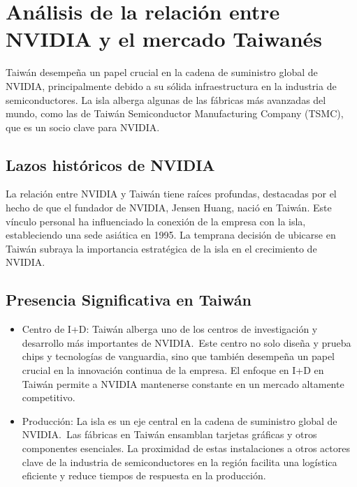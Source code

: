 \documentclass[conference]{IEEEtran}
\begin{document}
\section{Análisis de la relación entre NVIDIA y el mercado Taiwanés}

Taiwán desempeña un papel crucial en la cadena de suministro
global de NVIDIA, principalmente debido a su sólida
infraestructura en la industria de semiconductores. La isla
alberga algunas de las fábricas más avanzadas del mundo, como
las de Taiwán Semiconductor Manufacturing Company (TSMC), que
es un socio clave para NVIDIA.\@{}

\subsection*{Lazos históricos de NVIDIA}

La relación entre NVIDIA y Taiwán tiene raíces profundas, destacadas
por el hecho de que el fundador de NVIDIA, Jensen Huang, nació en
Taiwán. Este vínculo personal ha influenciado la conexión de la
empresa con la isla, estableciendo una sede asiática en 1995. La
temprana decisión de ubicarse en Taiwán subraya la importancia
estratégica de la isla en el crecimiento de NVIDIA.\@{}

\subsection*{Presencia Significativa en Taiwán}

\begin{itemize}
	\item Centro de I+D:\@{}
	      Taiwán alberga uno de los centros de investigación y
	      desarrollo más importantes de NVIDIA.~Este centro no solo
	      diseña y prueba chips y tecnologías de vanguardia, sino que
	      también desempeña un papel crucial en la innovación continua
	      de la empresa. El enfoque en I+D en Taiwán permite a NVIDIA
	      mantenerse constante en un mercado altamente competitivo.

	\item Producción:
	      La isla es un eje central en la cadena de suministro global
	      de NVIDIA.~Las fábricas en Taiwán ensamblan tarjetas gráficas
	      y otros componentes esenciales. La proximidad de estas
	      instalaciones a otros actores clave de la industria de
	      semiconductores en la región facilita una logística eficiente
	      y reduce tiempos de respuesta en la producción.

\end{itemize}
\end{document}
